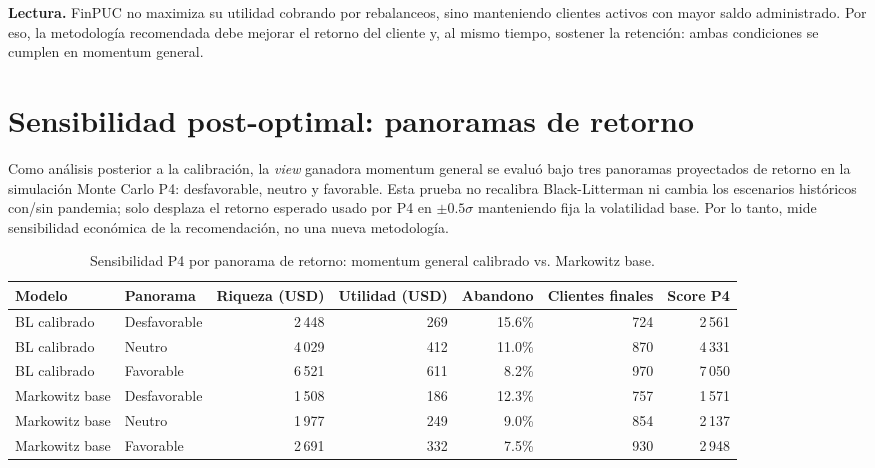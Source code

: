 \medskip
\noindent\textbf{Lectura.} FinPUC no maximiza su utilidad cobrando por
rebalanceos, sino manteniendo clientes activos con mayor saldo administrado. Por
eso, la metodolog\'ia recomendada debe mejorar el retorno del cliente y, al mismo
tiempo, sostener la retenci\'on: ambas condiciones se cumplen en momentum
general.

\section{Sensibilidad post-optimal: panoramas de retorno}

Como an\'alisis posterior a la calibraci\'on, la \textit{view} ganadora
momentum general se evalu\'o bajo tres panoramas proyectados de retorno en la
simulaci\'on Monte Carlo P4: desfavorable, neutro y favorable. Esta prueba no
recalibra Black-Litterman ni cambia los escenarios hist\'oricos con/sin
pandemia; solo desplaza el retorno esperado usado por P4 en $\pm 0.5\sigma$
manteniendo fija la volatilidad base. Por lo tanto, mide sensibilidad
econ\'omica de la recomendaci\'on, no una nueva metodolog\'ia.

\begin{table}[h]
\centering
\caption{Sensibilidad P4 por panorama de retorno: momentum general calibrado
vs. Markowitz base.}
\label{tab:panoramas_p4}
\scriptsize
\begin{adjustbox}{max width=\textwidth}
\begin{tabular}{@{}llrrrrr@{}}
\toprule
Modelo & Panorama & Riqueza (USD) & Utilidad (USD) & Abandono & Clientes finales & Score P4 \\
\midrule
BL calibrado & Desfavorable & 2\,448 & 269 & 15.6\% & 724 & 2\,561 \\
BL calibrado & Neutro & 4\,029 & 412 & 11.0\% & 870 & 4\,331 \\
BL calibrado & Favorable & 6\,521 & 611 & 8.2\% & 970 & 7\,050 \\
Markowitz base & Desfavorable & 1\,508 & 186 & 12.3\% & 757 & 1\,571 \\
Markowitz base & Neutro & 1\,977 & 249 & 9.0\% & 854 & 2\,137 \\
Markowitz base & Favorable & 2\,691 & 332 & 7.5\% & 930 & 2\,948 \\
\bottomrule
\end{tabular}
\end{adjustbox}
\end{table}


